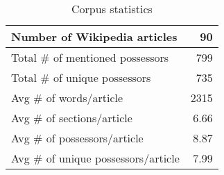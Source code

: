 \begin{table}[t]
\centering
\begin{tabular}{|l|r|} \hline
Number of Wikipedia articles & 90 \\ \hline
Total \# of mentioned possessors & 799 \\ \hline
Total \# of unique possessors & 735 \\ \hline
Avg \# of words/article & 2315 \\ \hline
Avg \# of sections/article & 6.66 \\ \hline
Avg \# of possessors/article & 8.87 \\ \hline
Avg \# of unique possessors/article & 7.99 \\ \hline
\end{tabular}
\caption{Corpus statistics} \label{tab:corpus-stats}
\end{table}
